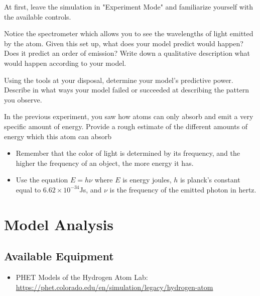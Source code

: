 \begin{steps}
	\item At first, leave the simulation in "Experiment Mode" and familiarize yourself with the available controls. 
	
	\item Notice the spectrometer which allows you to see the wavelengths of light emitted by the atom. Given this set up, what does your model predict would happen? Does it predict an order of emission? Write down a qualitative description what would happen according to your model. 
	
	\item Using the tools at your disposal, determine your model's predictive power. Describe in what ways your model failed or succeeded at describing the pattern you observe.
	
	\item In the previous experiment, you saw how atoms can only absorb and emit a very specific amount of energy. Provide a rough estimate of the different amounts of energy which this atom can absorb
	\begin{itemize}
		\item Remember that the color of light is determined by its frequency, and the higher the frequency of an object, the more energy it has. 
		
		\item Use the equation $\mathit{E} = \mathit{h}\nu$ where $\mathit{E}$ is energy joules, $\mathit{h}$ is planck's constant equal to \newline $6.62 \times 10^{-34}$Js, and $\nu$ is the frequency of the emitted photon in hertz. 
	\end{itemize}
\end{steps}


\section{Model Analysis}

\subsection{Available Equipment}

\begin{itemize}
	\item PHET Models of the Hydrogen Atom Lab: \url{https://phet.colorado.edu/en/simulation/legacy/hydrogen-atom}
\end{itemize}

